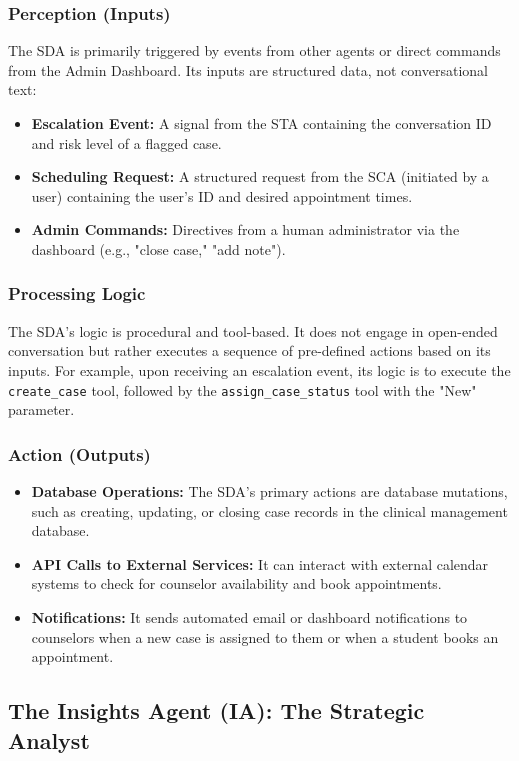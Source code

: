 \subsubsection{Perception (Inputs)}
The SDA is primarily triggered by events from other agents or direct commands from the Admin Dashboard. Its inputs are structured data, not conversational text:
\begin{itemize}
    \item \textbf{Escalation Event:} A signal from the STA containing the conversation ID and risk level of a flagged case.
    \item \textbf{Scheduling Request:} A structured request from the SCA (initiated by a user) containing the user's ID and desired appointment times.
    \item \textbf{Admin Commands:} Directives from a human administrator via the dashboard (e.g., "close case," "add note").
\end{itemize}

\subsubsection{Processing Logic}
The SDA's logic is procedural and tool-based. It does not engage in open-ended conversation but rather executes a sequence of pre-defined actions based on its inputs. For example, upon receiving an escalation event, its logic is to execute the \texttt{create\_case} tool, followed by the \texttt{assign\_case\_status} tool with the "New" parameter.

\subsubsection{Action (Outputs)}
\begin{itemize}
    \item \textbf{Database Operations:} The SDA's primary actions are database mutations, such as creating, updating, or closing case records in the clinical management database.
    \item \textbf{API Calls to External Services:} It can interact with external calendar systems to check for counselor availability and book appointments.
    \item \textbf{Notifications:} It sends automated email or dashboard notifications to counselors when a new case is assigned to them or when a student books an appointment.
\end{itemize}

\subsection{The Insights Agent (IA): The Strategic Analyst}

